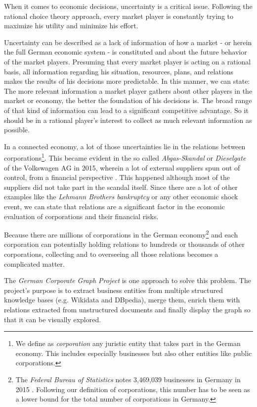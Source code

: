 \documentclass[
        a4paper,     %
        titlepage,   %
        oneside,     %
        parskip      %
]{scrartcl}          %
\begin{document}
    When it comes to economic decisions, uncertainty is a critical issue. Following the rational choice theory approach, every market player is constantly trying to maximize his utility and minimize his effort.

    Uncertainty can be described as a lack of information of how a market - or herein the full German economic system - is constituted and about the future behavior of the market players. Presuming that every market player is acting on a rational basis, all information regarding his situation, resources, plans, and relations makes the results of his decisions more predictable. In this manner, we can state: The more relevant information a market player gathers about other players in the market or economy, the better the foundation of his decisions is. The broad range of that kind of information can lead to a significant competitive advantage. So it should be in a rational player's interest to collect as much relevant information as possible.

    In a connected economy, a lot of those uncertainties lie in the relations between corporations\footnote{We define as \emph{corporation} any juristic entity that takes part in the German economy. This includes especially businesses but also other entities like public corporations.}. This became evident in the so called \emph{Abgas-Skandal} or \emph{Dieselgate} of the Volkswagen AG in 2015, wherein a lot of external suppliers spun out of control, from a financial perspective \cite{automobilwoche,stuttzeit}. This happened although most of the suppliers did not take part in the scandal itself. Since there are a lot of other examples like the \emph{Lehmann Brothers bankruptcy} or any other economic shock event, we can state that relations are a significant factor in the economic evaluation of corporations and their financial risks.

    Because there are millions of corporations in the German economy\footnote{ The \emph{Federal Bureau of Statistics} notes 3,469,039 businesses in Germany in 2015 \cite{destatis1}. Following our definition of corporations, this number has to be seen as a lower bound for the total number of corporations in Germany.} and each corporation can potentially holding relations to hundreds or thousands of other corporations, collecting and to overseeing all those relations becomes a complicated matter.

    The \emph{German Corporate Graph Project} is one approach to solve this problem. The project's purpose is to extract business entities from multiple structured knowledge bases (e.g. Wikidata and DBpedia), merge them, enrich them with relations extracted from unstructured documents and finally display the graph so that it can be visually explored.
\end{document}
